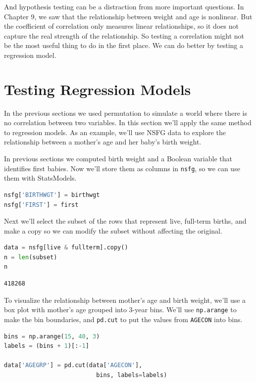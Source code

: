 And hypothesis testing can be a distraction from more important
questions. In Chapter 9, we saw that the relationship between weight and
age is nonlinear. But the coefficient of correlation only measures
linear relationships, so it does not capture the real strength of the
relationship. So testing a correlation might not be the most useful
thing to do in the first place. We can do better by testing a regression
model.

\hypertarget{testing-regression-models}{%
\section{Testing Regression Models}\label{testing-regression-models}}

In the previous sections we used permutation to simulate a world where
there is no correlation between two variables. In this section we'll
apply the same method to regression models. As an example, we'll use
NSFG data to explore the relationship between a mother's age and her
baby's birth weight.

In previous sections we computed birth weight and a Boolean variable
that identifies first babies. Now we'll store them as columns in
\passthrough{\lstinline!nsfg!}, so we can use them with StatsModels.

\begin{lstlisting}[language=Python,style=source]
nsfg['BIRTHWGT'] = birthwgt
nsfg['FIRST'] = first
\end{lstlisting}

Next we'll select the subset of the rows that represent live, full-term
births, and make a copy so we can modify the subset without affecting
the original.

\begin{lstlisting}[language=Python,style=source]
data = nsfg[live & fullterm].copy()
n = len(subset)
n
\end{lstlisting}

\begin{lstlisting}[style=output]
418268
\end{lstlisting}

To visualize the relationship between mother's age and birth weight,
we'll use a box plot with mother's age grouped into 3-year bins. We'll
use \passthrough{\lstinline!np.arange!} to make the bin boundaries, and
\passthrough{\lstinline!pd.cut!} to put the values from
\passthrough{\lstinline!AGECON!} into bins.

\begin{lstlisting}[language=Python,style=source]
bins = np.arange(15, 40, 3)
labels = (bins + 1)[:-1]

data['AGEGRP'] = pd.cut(data['AGECON'], 
                          bins, labels=labels)
\end{lstlisting}

